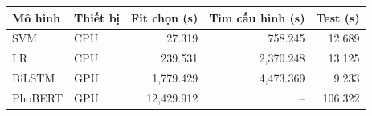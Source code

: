 \begin{tabular}{llrrr}\toprule
Mô hình & Thiết bị & Fit chọn (s) & Tìm cấu hình (s) & Test (s)\\\midrule
SVM & CPU & 27.319 & 758.245 & 12.689\\
LR & CPU & 239.531 & 2,370.248 & 13.125\\
BiLSTM & GPU & 1,779.429 & 4,473.369 & 9.233\\
PhoBERT & GPU & 12,429.912 & -- & 106.322\\
\bottomrule\end{tabular}
